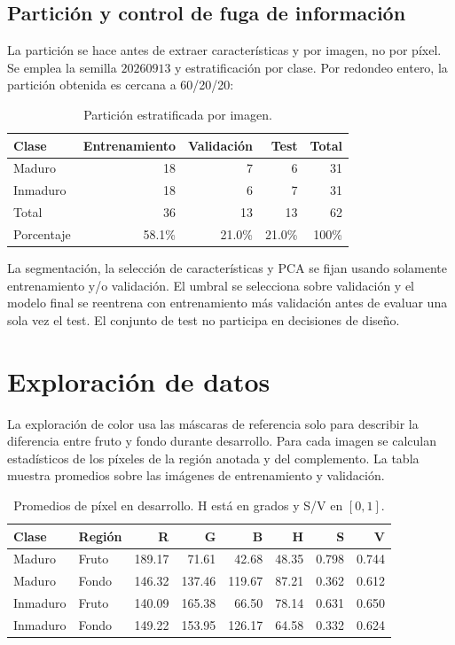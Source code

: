 \documentclass[11pt,a4paper]{article}
\begin{document}
\subsection{Partición y control de fuga de información}

La partición se hace antes de extraer características y por imagen, no por píxel.
Se emplea la semilla $20260913$ y estratificación por clase. Por redondeo entero,
la partición obtenida es cercana a 60/20/20:

\begin{table}[H]
\centering
\caption{Partición estratificada por imagen.}
\begin{tabular}{lrrr|r}
\toprule
Clase & Entrenamiento & Validación & Test & Total \\
\midrule
Maduro & 18 & 7 & 6 & 31 \\
Inmaduro & 18 & 6 & 7 & 31 \\
\midrule
Total & 36 & 13 & 13 & 62 \\
Porcentaje & 58.1\% & 21.0\% & 21.0\% & 100\% \\
\bottomrule
\end{tabular}
\end{table}

La segmentación, la selección de características y PCA se fijan usando solamente
entrenamiento y/o validación. El umbral se selecciona sobre validación y el modelo
final se reentrena con entrenamiento más validación antes de evaluar una sola vez
el test. El conjunto de test no participa en decisiones de diseño.

\section{Exploración de datos}

La exploración de color usa las máscaras de referencia solo para describir la
diferencia entre fruto y fondo durante desarrollo. Para cada imagen se calculan
estadísticos de los píxeles de la región anotada y del complemento. La tabla muestra
promedios sobre las imágenes de entrenamiento y validación.

\begin{table}[H]
\centering
\scriptsize
\caption{Promedios de píxel en desarrollo. H está en grados y S/V en $[0,1]$.}
\begin{tabular}{llrrrrrr}
\toprule
Clase & Región & R & G & B & H & S & V \\
\midrule
Maduro & Fruto & 189.17 & 71.61 & 42.68 & 48.35 & 0.798 & 0.744 \\
Maduro & Fondo & 146.32 & 137.46 & 119.67 & 87.21 & 0.362 & 0.612 \\
Inmaduro & Fruto & 140.09 & 165.38 & 66.50 & 78.14 & 0.631 & 0.650 \\
Inmaduro & Fondo & 149.22 & 153.95 & 126.17 & 64.58 & 0.332 & 0.624 \\
\bottomrule
\end{tabular}
\end{table}
\end{document}
